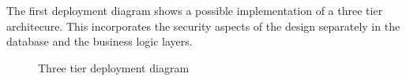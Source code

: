 \documentclass[a4paper]{article}
\begin{document}
The first deployment diagram shows a possible implementation of a three tier
architecure. This incorporates the security aspects of the design separately in
the database and the business logic layers.

\begin{figure}[h!]
	\centering
	\caption{Three tier deployment diagram}
\end{figure}
\clearpage
\end{document}
